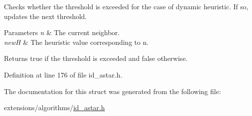 Checks whether the threshold is exceeded for the case of dynamic heuristic. If so, updates the next threshold. 


\begin{DoxyParams}{Parameters}
{\em n} & The current neighbor. \\
\hline
{\em newH} & The heuristic value corresponding to {\ttfamily n}. \\
\hline
\end{DoxyParams}
\begin{DoxyReturn}{Returns}
{\ttfamily true} if the threshold is exceeded and {\ttfamily false} otherwise. 
\end{DoxyReturn}


Definition at line 176 of file id\+\_\+astar.\+h.



The documentation for this struct was generated from the following file\+:\begin{DoxyCompactItemize}
\item 
extensions/algorithms/\hyperlink{id__astar_8h}{id\+\_\+astar.\+h}\end{DoxyCompactItemize}
